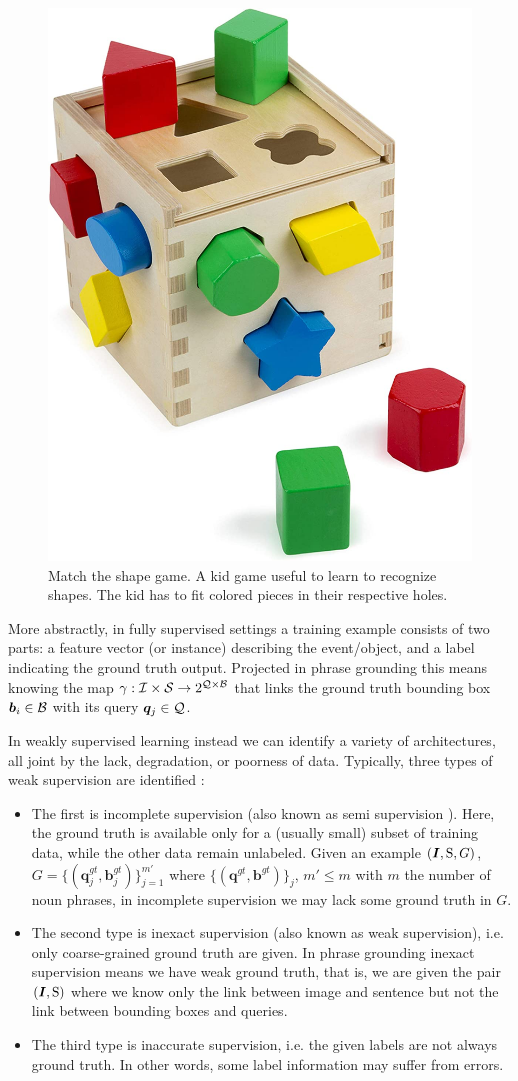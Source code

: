 \begin{figure}[H]
  \centering
  \includegraphics[width=.4\textwidth]{figures/match-shapes-game.jpg}
  \caption[Match the shape game]{
    Match the shape game. A kid game useful to learn to recognize
    shapes. The kid has to fit colored pieces in their respective
    holes.
  }
  \label{fig:match-the-shape-game}
\end{figure}

More abstractly, in fully supervised settings a training example
consists of two parts: a feature vector (or instance) describing the
event/object, and a label indicating the ground truth output.
Projected in phrase grounding this means knowing the map $\gamma :
\mathcal{I} \times \mathcal{S} \rightarrow 2^{\mathcal{Q} \times \mathcal{B}}$ that links the
ground truth bounding box $\bm{b}_i \in \mathcal{B}$ with its query
$\bm{q}_j \in \mathcal{Q}$.

In weakly supervised learning instead we can identify a variety of
architectures, all joint by the lack, degradation, or poorness of
data. Typically, three types of weak supervision are identified
\cite{zhou2018brief}:

\begin{itemize}
  \item The first is incomplete supervision (also known as semi
  supervision \cite{rohrbach2016grounding}). Here, the ground truth is
  available only for a (usually small) subset of training data, while
  the other data remain unlabeled. Given an example $(\bm{I}, \mathrm{S},
  G)$, $G = \{ (\bm{q}^{gt}_j, \bm{b}^{gt}_j) \}^{m'}_{j=1}$ where $\{
  (\bm{q}^{gt}, \bm{b}^{gt}) \}_j$, $m' \leq m$ with $m$ the number of
  noun phrases, in incomplete supervision we may lack some ground
  truth in $G$.
  \item The second type is inexact supervision (also known as weak
  supervision), i.e. only coarse-grained ground truth are given. In
  phrase grounding inexact supervision means we have weak ground
  truth, that is, we are given the pair $(\bm{I}, \mathrm{S})$ where we
  know only the link between image and sentence but not the link
  between bounding boxes and queries.
  \item The third type is inaccurate supervision, i.e. the given
  labels are not always ground truth. In other words, some label
  information may suffer from errors.
\end{itemize}

